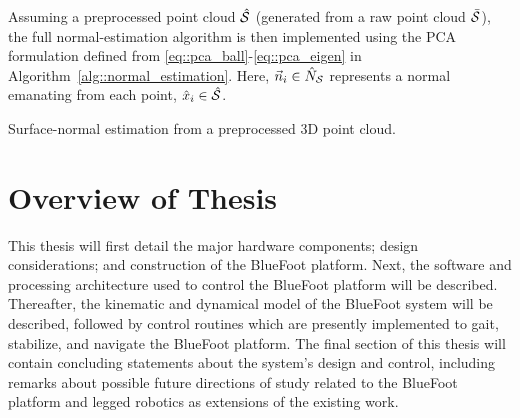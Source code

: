 		Assuming a preprocessed point cloud $\hat{{\cal S}}$ (generated from a raw point cloud $\bar{{\cal S}}$), the full normal-estimation algorithm is then implemented using the PCA formulation defined from \ref{eq::pca_ball}-\ref{eq::pca_eigen} in Algorithm~\ref{alg::normal_estimation}. Here, $\vec{n}_{i} \in \hat{N}_{{\cal S}}$ represents a normal emanating from each \Ith point, $\hat{x}_{i} \in \hat{{\cal S}}$.

			\begin{algorithm}[!h]
				\begin{algorithmic}
				\EndFor
				\end{algorithmic}
				\caption{Surface-normal estimation from a preprocessed 3D point cloud.}
				\label{alg::normal_estimation}
			\end{algorithm}
		

	\section{Overview of Thesis}

		This thesis will first detail the major hardware components; design considerations; and construction of the BlueFoot platform. Next, the software and processing architecture used to control the BlueFoot platform will be described. Thereafter, the kinematic and dynamical model of the BlueFoot system will be described, followed by control routines which are presently implemented to gait, stabilize, and navigate the BlueFoot platform. The final section of this thesis will contain concluding statements about the system's design and control, including remarks about possible future directions of study related to the BlueFoot platform and legged robotics as extensions of the existing work.
